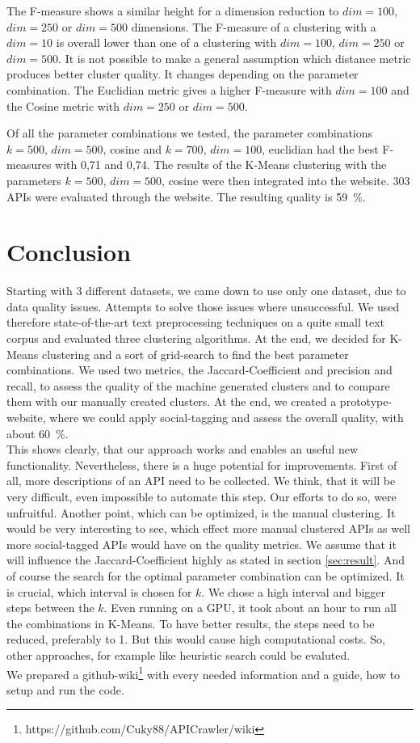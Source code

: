 \documentclass[a4paper]{IEEEtran}
\begin{document}
The F-measure shows a similar height for a dimension reduction to $dim ⁡= 100$, $dim⁡= 250$ or $dim⁡= 500$ dimensions. The F-measure of a clustering with a $dim=10$ is overall lower than one of a clustering with $dim⁡= 100$, $dim⁡= 250$ or $dim⁡= 500$. 
It is not possible to make a general assumption which distance metric produces better cluster quality. It changes depending on the parameter combination. The Euclidian metric gives a higher F-measure with $dim⁡= 100$ and the Cosine metric with $dim⁡= 250$ or $dim⁡= 500$.

Of all the parameter combinations we tested, the parameter combinations $k⁡= 500$, $dim⁡= 500$, cosine and $k⁡= 700$, $dim⁡= 100$, euclidian had the best F-measures with 0,71 and 0,74.
The results of the K-Means clustering with the parameters $k⁡= 500$, $dim⁡= 500$, cosine were then integrated into the website. 303 APIs were evaluated through the website. The resulting quality is 59~\%.

\section{Conclusion}
Starting with 3 different datasets, we came down to use only one dataset, due to data quality issues. Attempts to solve those issues where unsuccessful. We used therefore state-of-the-art text preprocessing techniques on a quite small text corpus and evaluated three clustering algorithms. At the end, we decided for K-Means clustering and a sort of grid-search to find the best parameter combinations. We used two metrics, the Jaccard-Coefficient and precision and recall, to assess the quality of the machine generated clusters and to compare them with our manually created clusters. At the end, we created a prototype-website, where we could apply social-tagging and assess the overall quality, with about 60~\%.\\

This shows clearly, that our approach works and enables an useful new functionality. Nevertheless, there is a huge potential for improvements. First of all, more descriptions of an API need to be collected. We think, that it will be very difficult, even impossible to automate this step. Our efforts to do so, were unfruitful. Another point, which can be optimized, is the manual clustering. It would be very interesting to see, which effect more manual clustered APIs as well more social-tagged APIs would have on the quality metrics. We assume that it will influence the Jaccard-Coefficient highly as stated in section \ref{sec:result}. And of course the search for the optimal parameter combination can be optimized. It is crucial, which interval is chosen for $k$. We chose a high interval and bigger steps between the $k$. Even running on a GPU, it took about an hour to run all the combinations in K-Means. To have better results, the steps need to be reduced, preferably to 1. But this would cause high computational costs. So, other approaches, for example like heuristic search could be evaluted.\\

We prepared a github-wiki\footnote{https://github.com/Cuky88/APICrawler/wiki} with every needed information and a guide, how to setup and run the code. 



\end{document}
